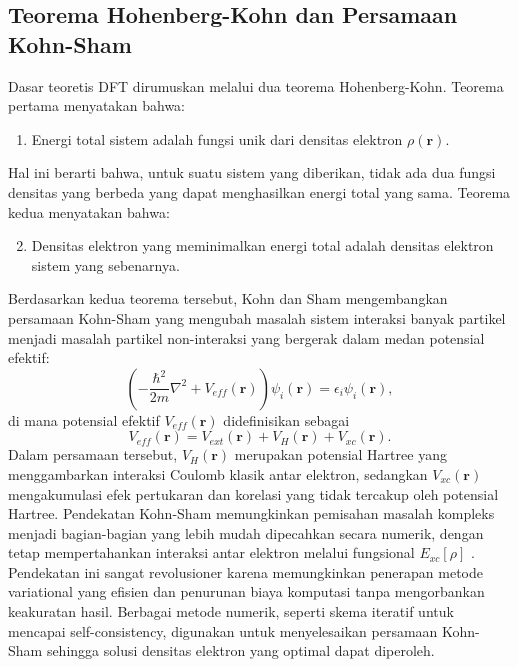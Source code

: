 \subsection{Teorema Hohenberg-Kohn dan Persamaan Kohn-Sham}
Dasar teoretis DFT dirumuskan melalui dua teorema Hohenberg-Kohn.
Teorema pertama menyatakan bahwa:
\begin{enumerate}
    \item Energi total sistem adalah fungsi unik dari densitas elektron \(\rho(\mathbf{r})\).
\end{enumerate}
Hal ini berarti bahwa, untuk suatu sistem yang diberikan, tidak ada dua fungsi densitas yang berbeda yang dapat menghasilkan energi total yang sama.
Teorema kedua menyatakan bahwa:
\begin{enumerate}
    \setcounter{enumi}{1}
    \item Densitas elektron yang meminimalkan energi total adalah densitas elektron sistem yang sebenarnya.
\end{enumerate}
Berdasarkan kedua teorema tersebut, Kohn dan Sham mengembangkan persamaan Kohn-Sham yang mengubah masalah sistem interaksi banyak partikel menjadi masalah partikel non-interaksi yang bergerak dalam medan potensial efektif:
\begin{equation}
    \left(-\frac{\hbar^2}{2m}\nabla^2 + V_{eff}(\mathbf{r})\right)\psi_i(\mathbf{r}) = \epsilon_i \psi_i(\mathbf{r}),
\end{equation}
di mana potensial efektif \(V_{eff}(\mathbf{r})\) didefinisikan sebagai
\begin{equation}
    V_{eff}(\mathbf{r}) = V_{ext}(\mathbf{r}) + V_H(\mathbf{r}) + V_{xc}(\mathbf{r}).
\end{equation}
Dalam persamaan tersebut, \(V_H(\mathbf{r})\) merupakan potensial Hartree yang menggambarkan interaksi Coulomb klasik antar elektron, sedangkan \(V_{xc}(\mathbf{r})\) mengakumulasi efek pertukaran dan korelasi yang tidak tercakup oleh potensial Hartree.
Pendekatan Kohn-Sham memungkinkan pemisahan masalah kompleks menjadi bagian-bagian yang lebih mudah dipecahkan secara numerik, dengan tetap mempertahankan interaksi antar elektron melalui fungsional \(E_{xc}[\rho]\) \cite{Kohn1965, Perdew1996}.
Pendekatan ini sangat revolusioner karena memungkinkan penerapan metode variational yang efisien dan penurunan biaya komputasi tanpa mengorbankan keakuratan hasil.
Berbagai metode numerik, seperti skema iteratif untuk mencapai self-consistency, digunakan untuk menyelesaikan persamaan Kohn-Sham sehingga solusi densitas elektron yang optimal dapat diperoleh.

